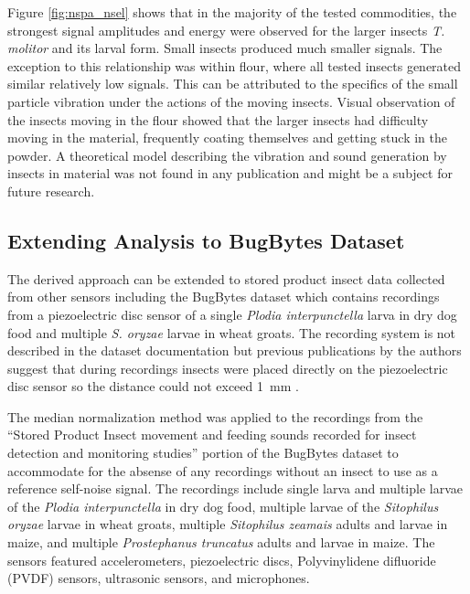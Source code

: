 Figure \ref{fig:nspa_nsel} shows that in the majority of the tested commodities, the strongest signal amplitudes and energy were observed for the larger insects \textit{T. molitor} and its larval form. Small insects produced much smaller signals. The exception to this relationship was within flour, where all tested insects generated similar relatively low signals. This can be attributed to the specifics of the small particle vibration under the actions of the moving insects. Visual observation of the insects moving in the flour showed that the larger insects had difficulty moving in the material, frequently coating themselves and getting stuck in the powder. A theoretical model describing the vibration and sound generation by insects in material was not found in any publication and might be a subject for future research.

\newpage
\subsection{Extending Analysis to BugBytes Dataset}

The derived approach can be extended to stored product insect data collected from other sensors including the BugBytes dataset which contains recordings from a piezoelectric disc sensor of a single \textit{Plodia interpunctella} larva in dry dog food and multiple \textit{S. oryzae} larvae in wheat groats. The recording system is not described in the dataset documentation but previous publications by the authors suggest that during recordings insects were placed directly on the piezoelectric disc sensor so the distance could not exceed \SI{1}{\milli\meter} \cite{mankinAcousticIndicatorsTargeted2010}.

The median normalization method was applied to the recordings from the ``Stored Product Insect movement and feeding sounds recorded for insect detection and monitoring studies'' portion of the BugBytes dataset to accommodate for the absense of any recordings without an insect to use as a reference self-noise signal. The recordings include single larva and multiple larvae of the \textit{Plodia interpunctella} in dry dog food, multiple larvae of the \textit{Sitophilus oryzae} larvae in wheat groats, multiple \textit{Sitophilus zeamais} adults and larvae in maize, and multiple \textit{Prostephanus truncatus} adults and larvae in maize. The sensors featured accelerometers, piezoelectric discs, Polyvinylidene difluoride (PVDF) sensors, ultrasonic sensors, and microphones.

